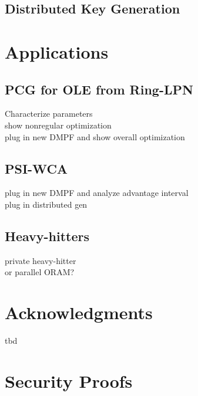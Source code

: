 \documentclass[sigconf]{acmart}
\begin{document}
\subsection{Distributed Key Generation}
\section{Applications}
\subsection{PCG for OLE from Ring-LPN}
Characterize parameters\\
show nonregular optimization\\
plug in new DMPF and show overall optimization
\subsection{PSI-WCA}
plug in new DMPF and analyze advantage interval\\
plug in distributed gen
\subsection{Heavy-hitters}
private heavy-hitter\\
or parallel ORAM?
\section{Acknowledgments}
tbd






\appendix
\section{Security Proofs}
\end{document}
